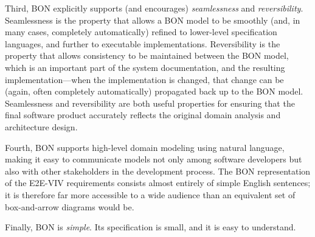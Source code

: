 \documentclass[]{report}
\begin{document}
Third, BON explicitly supports (and encourages) \emph{seamlessness}
and \emph{reversibility}. Seamlessness is the property that allows a
BON model to be smoothly (and, in many cases, completely
automatically) refined to lower-level specification languages, and
further to executable implementations. Reversibility is the property
that allows consistency to be maintained between the BON model, which
is an important part of the system documentation, and the resulting
implementation---when the implementation is changed, that change can
be (again, often completely automatically) propagated back up to the
BON model. Seamlessness and reversibility are both useful properties
for ensuring that the final software product accurately reflects the
original domain analysis and architecture design.

Fourth, BON supports high-level domain modeling using natural
language, making it easy to communicate models not only among software
developers but also with other stakeholders in the development
process. The BON representation of the E2E-VIV requirements consists
almost entirely of simple English sentences; it is therefore far more
accessible to a wide audience than an equivalent set of box-and-arrow
diagrams would be.

Finally, BON is \emph{simple}. Its specification is small, and it is
easy to understand.

\end{document}
